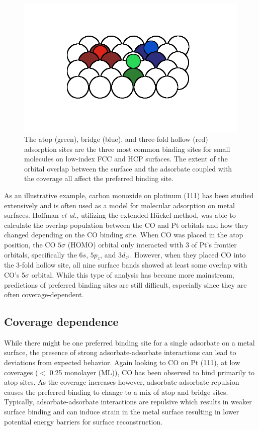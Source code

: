 \begin{figure}[p!]
  \includegraphics[width=\linewidth]{../figures/chap1/binding.pdf}
  \caption{The atop (green), bridge (blue), and three-fold hollow (red)
adsorption sites are the three most common binding sites for small molecules on
low-index FCC and HCP surfaces. The extent of the orbital overlap between the surface and the adsorbate coupled with the coverage all affect the preferred binding site.}
\label{fig:binding}
\end{figure}

As an illustrative example, carbon monoxide on platinum (111) has been studied
extensively\citep{Ertl:1977cg, Kelemen:1979ad, Yeo:1997th, Wong:1991ta,
Feibelman:2001qa, Deshlahra:2009wu, Deshlahra:2012aa} and is often used as a
model for molecular adsorption on metal surfaces.  Hoffman {\em et al.},
utilizing the extended H\"uckel method,\citep{Wong:1991ta} was able to
calculate the overlap population between the CO and Pt orbitals and how they
changed depending on the CO  binding site.  When CO was placed in the atop
position, the CO $5\sigma$ (HOMO) orbital only interacted with 3 of Pt's
frontier orbitals, specifically the $6s$, $5p_z$, and $3d_{z^2}$. However, when
they placed CO into the 3-fold hollow site, all nine surface bands showed at
least some overlap with CO's 5$\sigma$ orbital. While this type of analysis has
become more mainstream, predictions of preferred binding sites are still
difficult, especially since they are often coverage-dependent.

\subsection{Coverage dependence}
While there might be one preferred binding site for a single adsorbate on a
metal surface, the presence of strong adsorbate-adsorbate interactions can lead
to deviations from expected behavior. Again looking to CO on Pt (111), at low
coverages ($<$ 0.25 monolayer (ML)), CO has been observed to bind primarily to
atop sites.\citep{Kelemen:1979ad, Feibelman:2001qa} As the coverage increases
however, adsorbate-adsorbate repulsion causes the preferred binding to change
to a mix of atop and bridge sites.\citep{Deshlahra:2012aa} Typically,
adsorbate-adsorbate interactions are repulsive which results in weaker surface
binding and can induce strain in the metal surface resulting in lower potential
energy barriers for surface reconstruction.


